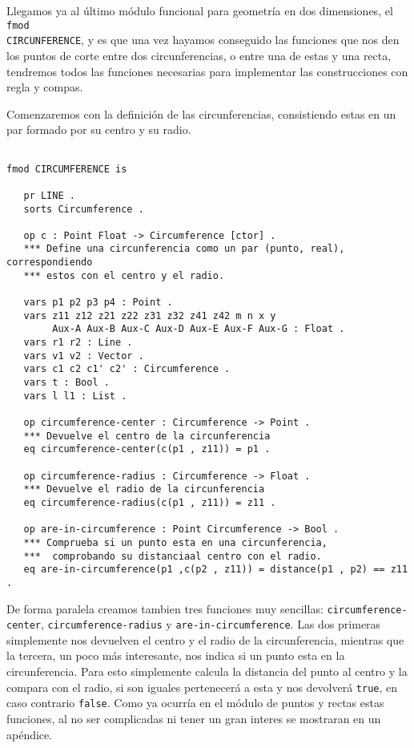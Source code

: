 
Llegamos ya al último módulo funcional para geometría en dos dimensiones, el \texttt{fmod} \\ \texttt{CIRCUNFERENCE}, y es que una vez hayamos conseguido las funciones que nos den los puntos de corte entre dos circunferencias, o entre una de estas y una recta, tendremos todos las funciones necesarias para implementar las construcciones con regla y compas. \par

Comenzaremos con la definición de las circunferencias, consistiendo estas en un par formado por su centro y su radio. \par

{\codesize
\begin{verbatim}

fmod CIRCUMFERENCE is

   pr LINE .
   sorts Circumference .

   op c : Point Float -> Circumference [ctor] .
   *** Define una circunferencia como un par (punto, real), correspondiendo 
   *** estos con el centro y el radio.
	
   vars p1 p2 p3 p4 : Point .
   vars z11 z12 z21 z22 z31 z32 z41 z42 m n x y 
        Aux-A Aux-B Aux-C Aux-D Aux-E Aux-F Aux-G : Float .
   vars r1 r2 : Line .
   vars v1 v2 : Vector .
   vars c1 c2 c1' c2' : Circumference .
   vars t : Bool .
   vars l l1 : List .
		
   op circumference-center : Circumference -> Point .
   *** Devuelve el centro de la circunferencia
   eq circumference-center(c(p1 , z11)) = p1 .

   op circumference-radius : Circumference -> Float .
   *** Devuelve el radio de la circunferencia
   eq circumference-radius(c(p1 , z11)) = z11 .

   op are-in-circumference : Point Circumference -> Bool .
   *** Comprueba si un punto esta en una circunferencia, 
   ***  comprobando su distanciaal centro con el radio.
   eq are-in-circumference(p1 ,c(p2 , z11)) = distance(p1 , p2) == z11 .

\end{verbatim}  
}

De forma paralela creamos tambien tres funciones muy sencillas: \texttt{circumference-center}, \texttt{circumference-radius} y \texttt{are-in-circumference}. Las dos primeras simplemente nos devuelven el centro y el radio de la circunferencia, mientras que la tercera, un poco más interesante, nos indica si un punto esta en la circunferencia. Para esto simplemente calcula la distancia del punto al centro y la compara con el radio, si son iguales pertenecerá a esta y nos devolverá \texttt{true}, en caso contrario \texttt{false}. Como ya ocurría en el módulo de puntos y rectas estas funciones, al no ser complicadas ni tener un gran interes se mostraran en un apéndice. \par

